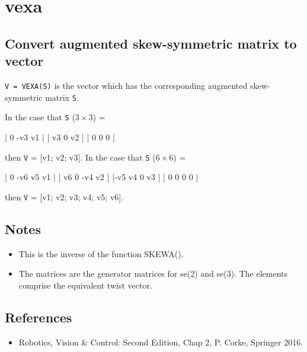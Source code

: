 \hypertarget{vexa}{\section*{vexa}}
\subsection*{Convert augmented skew-symmetric matrix to vector}


\texttt{V = VEXA(S)} is the vector which has the corresponding augmented skew-symmetric
matrix \texttt{S}.



In the case that \texttt{S} ($3 \times 3$) =

\begin{Code}
         |  0  -v3  v1 |
         | v3    0  v2 |
         |  0    0   0 |

\end{Code}


then \texttt{V} = [v1; v2; v3].  In the case that \texttt{S} ($6 \times 6$) =

\begin{Code}
         |  0  -v6   v5  v1 |
         | v6    0  -v4  v2 |
         |-v5   v4    0  v3 |
         |  0    0    0   0 |

\end{Code}


then \texttt{V} = [v1; v2; v3; v4; v5; v6].


\subsection*{Notes}
\begin{itemize}
  \item This is the inverse of the function SKEWA().
  \item The matrices are the generator matrices for se(2) and se(3).  The elements    comprise the equivalent twist vector.
\end{itemize}

\subsection*{References}
\begin{itemize}
  \item Robotics, Vision \& Control: Second Edition, Chap 2,    P. Corke, Springer 2016.
\end{itemize}

